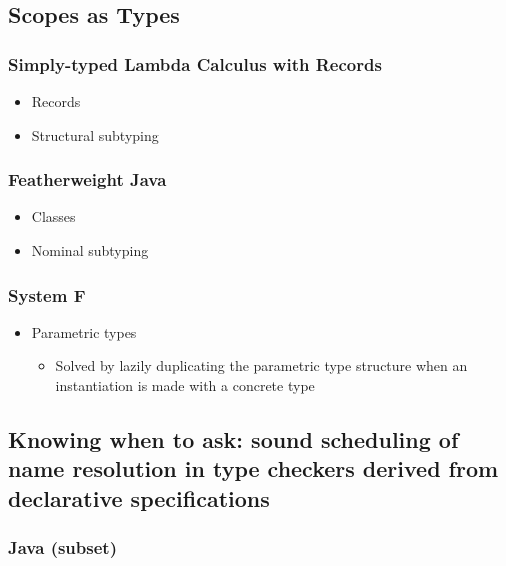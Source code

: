     \subsection{Scopes as Types}

      \subsubsection{Simply-typed Lambda Calculus with Records}

        \begin{itemize}
          \item Records
          \item Structural subtyping
        \end{itemize}

      \subsubsection{Featherweight Java}

        \begin{itemize}
          \item Classes
          \item Nominal subtyping
        \end{itemize}

      \subsubsection{System F}

        \begin{itemize}
          \item Parametric types
          \begin{itemize}
            \item Solved by lazily duplicating the parametric type structure when an instantiation is made with a concrete type
          \end{itemize}
        \end{itemize}

    \subsection{Knowing when to ask: sound scheduling of name resolution in type checkers derived from declarative specifications}

      \subsubsection{Java (subset)}

